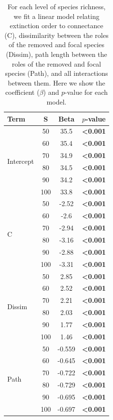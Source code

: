 \documentclass[12pt]{article}
\begin{document}
	\begin{table}[h!]
		\caption{For each level of species richness, we fit a linear model relating extinction order to connectance (C), dissimilarity between the roles of the removed and focal species (Dissim), path length between the roles of the removed and focal species (Path), and all interactions between them. Here we show the coefficient ($\beta$) and $p$-value for each model.}
		\label{lmertable}
		\begin{tabular}{l | c c c |}
		Term&S&Beta&$p$-value\\
		\hline 
		\multirow{6}{*}{Intercept}&50&35.5&\textbf{\textless0.001}\\ 
		&60&35.4&\textbf{\textless0.001}\\ 
		&70&34.9&\textbf{\textless0.001}\\ 
		&80&34.5&\textbf{\textless0.001}\\ 
		&90&34.2&\textbf{\textless0.001}\\ 
		&100&33.8&\textbf{\textless0.001}\\ 
		\hline
		\multirow{6}{*}{C}&50&-2.52&\textbf{\textless0.001}\\ 
		&60&-2.6&\textbf{\textless0.001}\\ 
		&70&-2.94&\textbf{\textless0.001}\\ 
		&80&-3.16&\textbf{\textless0.001}\\ 
		&90&-2.88&\textbf{\textless0.001}\\ 
		&100&-3.31&\textbf{\textless0.001}\\ 
		\hline
		\multirow{6}{*}{Dissim}&50&2.85&\textbf{\textless0.001}\\ 
		&60&2.52&\textbf{\textless0.001}\\ 
		&70&2.21&\textbf{\textless0.001}\\ 
		&80&2.03&\textbf{\textless0.001}\\ 
		&90&1.77&\textbf{\textless0.001}\\ 
		&100&1.46&\textbf{\textless0.001}\\ 
		\hline
		\multirow{6}{*}{Path}&50&-0.559&\textbf{\textless0.001}\\ 
		&60&-0.645&\textbf{\textless0.001}\\ 
		&70&-0.722&\textbf{\textless0.001}\\ 
		&80&-0.729&\textbf{\textless0.001}\\ 
		&90&-0.695&\textbf{\textless0.001}\\ 
		&100&-0.697&\textbf{\textless0.001}\\ 

\end{tabular}
\end{table}
\end{document}
